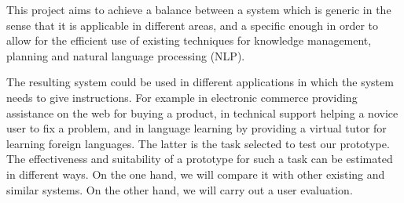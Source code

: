 



This project aims to achieve a balance between a system which is generic in the
sense that it is applicable in different areas, and a specific enough in order
to allow for the efficient use of existing techniques for knowledge management,
planning and natural language processing (NLP).


The resulting system could be used in different applications in which the
system needs to give instructions. For example in electronic commerce providing 
assistance on the web for buying a product, in technical support helping a
novice user to fix a problem, and in language learning by providing a
virtual tutor for learning foreign languages. The latter is the task selected to
test our prototype. The effectiveness and suitability of a prototype for such a
task can be estimated in different ways. On the one hand, we will compare it
with other existing and similar systems. On the other hand, we will
carry out a user evaluation. 

